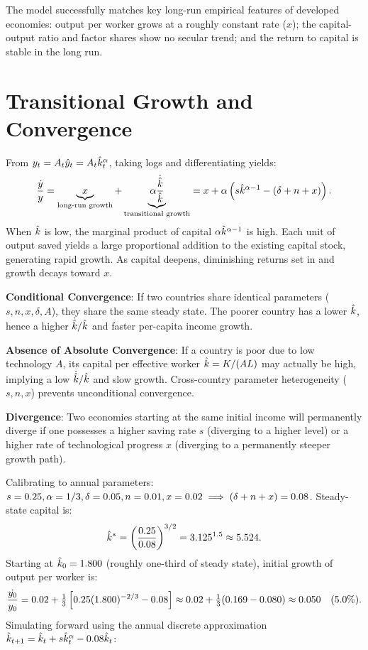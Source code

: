 \documentclass[11pt]{article}
\begin{document}
 The model successfully matches key long-run empirical features of developed economies: output per worker grows at a roughly constant rate ($x$); the capital-output ratio and factor shares show no secular trend; and the return to capital is stable in the long run.

\section{Transitional Growth and Convergence}

From $y_t = A_t \hat{y}_t = A_t \hat{k}_t^\alpha$, taking logs and differentiating yields:
\[
\frac{\dot{y}}{y} = \underbrace{x}_{\text{long-run growth}} + \underbrace{\alpha\frac{\dot{\hat{k}}}{\hat{k}}}_{\text{transitional growth}} = x + \alpha\left(s\hat{k}^{\alpha-1} - (\delta+n+x)\right).
\]
 When $\hat{k}$ is low, the marginal product of capital $\alpha\hat{k}^{\alpha-1}$ is high. Each unit of output saved yields a large proportional addition to the existing capital stock, generating rapid growth. As capital deepens, diminishing returns set in and growth decays toward $x$.

\begin{flatlist}
  \item \textbf{Conditional Convergence}: If two countries share identical parameters ($s, n, x, \delta, A$), they share the same steady state. The poorer country has a lower $\hat{k}$, hence a higher $\dot{\hat{k}} / \hat{k}$ and faster per-capita income growth.
  \item \textbf{Absence of Absolute Convergence}: If a country is poor due to low technology $A$, its capital per effective worker $\hat{k} = K / (AL)$ may actually be high, implying a low $\dot{\hat{k}} / \hat{k}$ and slow growth. Cross-country parameter heterogeneity ($s, n, x$) prevents unconditional convergence.
  \item \textbf{Divergence}: Two economies starting at the same initial income will permanently diverge if one possesses a higher saving rate $s$ (diverging to a higher level) or a higher rate of technological progress $x$ (diverging to a permanently steeper growth path).
\end{flatlist}

Calibrating to annual parameters: $s = 0.25, \alpha = 1/3, \delta = 0.05, n = 0.01, x = 0.02 \implies (\delta+n+x) = 0.08$. Steady-state capital is:
\[
\hat{k}^* = \left(\frac{0.25}{0.08}\right)^{3/2} = 3.125^{1.5} \approx 5.524.
\]
Starting at $\hat{k}_0 = 1.800$ (roughly one-third of steady state), initial growth of output per worker is:
\[
\frac{\dot{y_0}}{y_0} = 0.02 + \tfrac{1}{3}\left[0.25(1.800)^{-2/3} - 0.08\right] \approx 0.02 + \tfrac{1}{3}(0.169 - 0.080) \approx 0.050 \quad (5.0\%).
\]
Simulating forward using the annual discrete approximation $\hat{k}_{t+1} = \hat{k}_t + s\hat{k}_t^\alpha - 0.08\hat{k}_t$:
\end{document}
